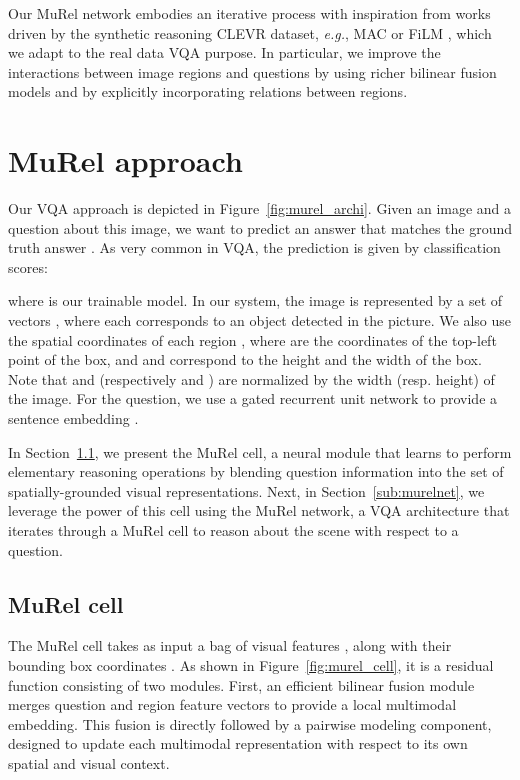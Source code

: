 \documentclass[10pt,twocolumn,letterpaper]{article}
\begin{document}
Our MuRel network embodies an iterative process with inspiration from works driven by the synthetic reasoning CLEVR dataset, \textit{e.g.}, MAC \cite{arad2018compositional} or FiLM \cite{perez2018film}, which we adapt to the real data VQA purpose. In particular, we improve the interactions between image regions and questions by using richer bilinear fusion models and by explicitly incorporating relations between regions. \section{MuRel approach}
Our VQA approach is depicted in Figure~\ref{fig:murel_archi}. Given an image  and a question  about this image, we want to predict an answer  that matches the ground truth answer . As very common in VQA, the prediction  is given by classification scores:


where  is our trainable model. In our system, the image is represented by a set of vectors , where each  corresponds to an object detected in the picture. We also use the spatial coordinates of each region , where  are the coordinates of the top-left point of the box, and  and  correspond to the height and the width of the box. Note that  and  (respectively  and ) are normalized by the width (resp. height) of the image.
For the question, we use a gated recurrent unit network to provide a sentence embedding . 

In Section~\ref{sub:MuRelcell}, we present the MuRel cell, a neural module that learns to perform elementary reasoning operations by blending question information into the set of spatially-grounded visual representations. Next, in Section~\ref{sub:murelnet}, we leverage the power of this cell using the MuRel network, a VQA architecture that iterates through a MuRel cell to reason about the scene with respect to a question.

\subsection{MuRel cell}
\label{sub:MuRelcell}

The MuRel cell takes as input a bag of  visual features , along with their bounding box coordinates .
As shown in Figure~\ref{fig:murel_cell}, it is a residual function consisting of two modules. First, an efficient bilinear fusion module merges question and region feature vectors to provide a local multimodal embedding. This fusion is directly followed by a pairwise modeling component, designed to update each multimodal representation with respect to its own spatial and visual context.
\end{document}
